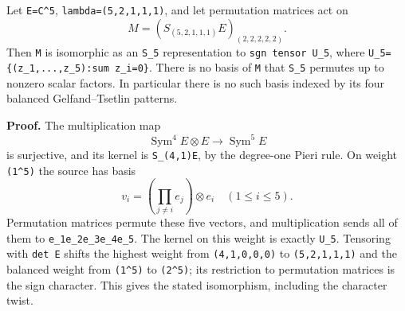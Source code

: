 \documentclass[
  10pt,
]{article}
\begin{document}
Let \texttt{\small E=\allowbreak{}C\textasciicircum{}5},
\texttt{\small lambda=\allowbreak{}(\allowbreak{}5,\allowbreak{}2,\allowbreak{}1,\allowbreak{}1,\allowbreak{}1)\allowbreak{}},
and let permutation matrices act on \[
M=(S_{(5,2,1,1,1)}E)_{(2,2,2,2,2)}.
\] Then \texttt{\small M} is isomorphic as an
\texttt{\small S\_\allowbreak{}5} representation to
\texttt{\small sgn tensor U\_\allowbreak{}5}, where
\texttt{\small U\_\allowbreak{}5=\allowbreak{}\{(\allowbreak{}z\_\allowbreak{}1,\allowbreak{}...,\allowbreak{}z\_\allowbreak{}5)\allowbreak{}:\allowbreak{}sum z\_\allowbreak{}i=\allowbreak{}0\}}.
There is no basis of \texttt{\small M} that
\texttt{\small S\_\allowbreak{}5} permutes up to nonzero scalar factors.
In particular there is no such basis indexed by its four balanced
Gelfand--Tsetlin patterns.

\textbf{Proof.} The multiplication map \[
\operatorname{Sym}^{4}E\otimes E\longrightarrow\operatorname{Sym}^{5}E
\] is surjective, and its kernel is
\texttt{\small S\_\allowbreak{}(\allowbreak{}4,\allowbreak{}1)\allowbreak{}E},
by the degree-one Pieri rule. On weight
\texttt{\small (\allowbreak{}1\textasciicircum{}5)\allowbreak{}} the
source has basis \[
v_i=\left(\prod_{j\ne i}e_j\right)\otimes e_i\quad(1\le i\le5).
\] Permutation matrices permute these five vectors, and multiplication
sends all of them to
\texttt{\small e\_\allowbreak{}1e\_\allowbreak{}2e\_\allowbreak{}3e\_\allowbreak{}4e\_\allowbreak{}5}.
The kernel on this weight is exactly \texttt{\small U\_\allowbreak{}5}.
Tensoring with \texttt{\small det E} shifts the highest weight from
\texttt{\small (\allowbreak{}4,\allowbreak{}1,\allowbreak{}0,\allowbreak{}0,\allowbreak{}0)\allowbreak{}}
to
\texttt{\small (\allowbreak{}5,\allowbreak{}2,\allowbreak{}1,\allowbreak{}1,\allowbreak{}1)\allowbreak{}}
and the balanced weight from
\texttt{\small (\allowbreak{}1\textasciicircum{}5)\allowbreak{}} to
\texttt{\small (\allowbreak{}2\textasciicircum{}5)\allowbreak{}}; its
restriction to permutation matrices is the sign character. This gives
the stated isomorphism, including the character twist.
\end{document}
